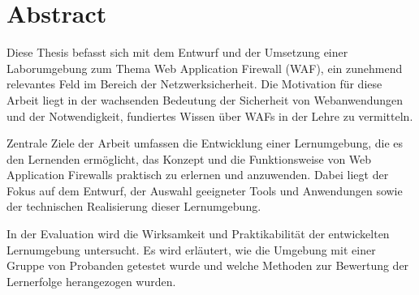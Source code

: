 \section{Abstract}
Diese Thesis befasst sich mit dem Entwurf und der Umsetzung einer Laborumgebung zum Thema Web Application Firewall (WAF), ein zunehmend relevantes Feld im Bereich der Netzwerksicherheit. 
Die Motivation für diese Arbeit liegt in der wachsenden Bedeutung der Sicherheit von Webanwendungen und der Notwendigkeit, fundiertes Wissen über WAFs in der Lehre zu vermitteln.

Zentrale Ziele der Arbeit umfassen die Entwicklung einer Lernumgebung, die es den Lernenden ermöglicht, das Konzept und die Funktionsweise von Web Application Firewalls praktisch zu erlernen und anzuwenden. 
Dabei liegt der Fokus auf dem Entwurf, der Auswahl geeigneter Tools und Anwendungen sowie der technischen Realisierung dieser Lernumgebung.

In der Evaluation wird die Wirksamkeit und Praktikabilität der entwickelten Lernumgebung untersucht. 
Es wird erläutert, wie die Umgebung mit einer Gruppe von Probanden getestet wurde und welche Methoden zur Bewertung der Lernerfolge herangezogen wurden. 

\pagebreak